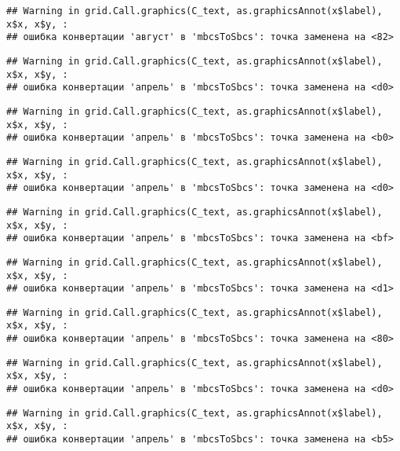 \documentclass[
]{article}
\begin{document}
\begin{verbatim}
## Warning in grid.Call.graphics(C_text, as.graphicsAnnot(x$label), x$x, x$y, :
## ошибка конвертации 'август' в 'mbcsToSbcs': точка заменена на <82>
\end{verbatim}

\begin{verbatim}
## Warning in grid.Call.graphics(C_text, as.graphicsAnnot(x$label), x$x, x$y, :
## ошибка конвертации 'апрель' в 'mbcsToSbcs': точка заменена на <d0>
\end{verbatim}

\begin{verbatim}
## Warning in grid.Call.graphics(C_text, as.graphicsAnnot(x$label), x$x, x$y, :
## ошибка конвертации 'апрель' в 'mbcsToSbcs': точка заменена на <b0>
\end{verbatim}

\begin{verbatim}
## Warning in grid.Call.graphics(C_text, as.graphicsAnnot(x$label), x$x, x$y, :
## ошибка конвертации 'апрель' в 'mbcsToSbcs': точка заменена на <d0>
\end{verbatim}

\begin{verbatim}
## Warning in grid.Call.graphics(C_text, as.graphicsAnnot(x$label), x$x, x$y, :
## ошибка конвертации 'апрель' в 'mbcsToSbcs': точка заменена на <bf>
\end{verbatim}

\begin{verbatim}
## Warning in grid.Call.graphics(C_text, as.graphicsAnnot(x$label), x$x, x$y, :
## ошибка конвертации 'апрель' в 'mbcsToSbcs': точка заменена на <d1>
\end{verbatim}

\begin{verbatim}
## Warning in grid.Call.graphics(C_text, as.graphicsAnnot(x$label), x$x, x$y, :
## ошибка конвертации 'апрель' в 'mbcsToSbcs': точка заменена на <80>
\end{verbatim}

\begin{verbatim}
## Warning in grid.Call.graphics(C_text, as.graphicsAnnot(x$label), x$x, x$y, :
## ошибка конвертации 'апрель' в 'mbcsToSbcs': точка заменена на <d0>
\end{verbatim}

\begin{verbatim}
## Warning in grid.Call.graphics(C_text, as.graphicsAnnot(x$label), x$x, x$y, :
## ошибка конвертации 'апрель' в 'mbcsToSbcs': точка заменена на <b5>
\end{verbatim}
\end{document}

